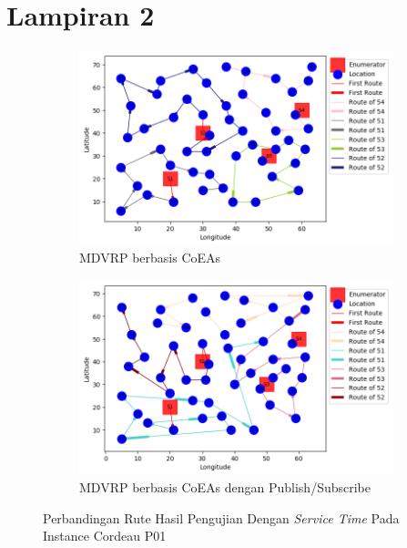 \chapter*{Lampiran 2}
\label{ch:test_result_cordeau_tw}


\begin{figure}[H]
	\centering
	\begin{subfigure}[t]{\textwidth}
		\centering
		\includegraphics[width=\textwidth]{Resources/Images/cordeau_p01_tw/cordeau_p01_tw_coes}
		\caption{MDVRP berbasis CoEAs}
		\label{fig:cordeau_p01_tw_coes}
	\end{subfigure}
	\begin{subfigure}[t]{\textwidth}
		\centering
		\includegraphics[width=\textwidth]{Resources/Images/cordeau_p01_tw/cordeau_p01_tw_pubsub_coes}
		\caption{MDVRP berbasis CoEAs dengan Publish/Subscribe}
		\label{fig:cordeau_p01_tw_pubsub_coes}
	\end{subfigure}
	\caption{Perbandingan Rute Hasil Pengujian Dengan \textit{Service Time} Pada Instance Cordeau P01}
	\label{fig:cordeau_p01_tw}
\end{figure}


